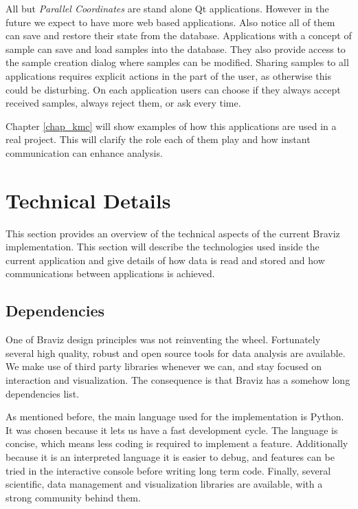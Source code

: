 All but \emph{Parallel Coordinates} are stand alone Qt applications. However in the future we expect to have more web based applications. Also notice all of them can save and restore their state from the database. Applications with a concept of sample can save and load samples into the database. They also provide access to the sample creation dialog where samples can be modified. Sharing samples to all applications requires explicit actions in the part of the user, as otherwise this could be disturbing. On each application users can choose if they always accept received samples, always reject them, or ask every time. 

Chapter \ref{chap_kmc} will show examples of how this applications are used in a real project. This will clarify the role each of them play and how instant communication can enhance analysis.



\section{Technical Details}

\label{sec_tech} 



This section provides an overview of the technical aspects of the current Braviz implementation. This section will describe the technologies used inside the current application and give details of how data is read and stored and how communications between applications is achieved. 


\subsection{Dependencies}

One of Braviz design principles was not reinventing the wheel. Fortunately several high quality, robust and open source tools for data analysis are available. We make use of third party libraries whenever we can, and stay focused on interaction and visualization. The consequence is that Braviz has a somehow long dependencies list. 

As mentioned before, the main language used for the implementation is Python. It was chosen because it lets us have a fast development cycle. The language is concise, which means less coding is required to implement a feature. Additionally because it is an interpreted language it is easier to debug, and features can be tried in the interactive console before writing long term code. Finally, several scientific, data management and visualization libraries are available, with a strong community behind them.

